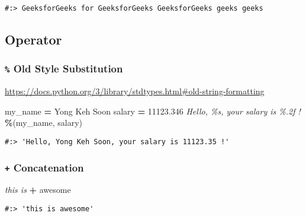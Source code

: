 \documentclass[
]{book}
\newenvironment{Shaded}{\begin{snugshade}}{\end{snugshade}}
\newcommand{\CommentTok}[1]{\textcolor[rgb]{0.37,0.37,0.37}{\textit{#1}}}
\newcommand{\FloatTok}[1]{\textcolor[rgb]{0.06,0.06,0.06}{#1}}
\newcommand{\NormalTok}[1]{#1}
\newcommand{\OperatorTok}[1]{\textcolor[rgb]{0.43,0.43,0.43}{\textbf{#1}}}
\newcommand{\StringTok}[1]{\textcolor[rgb]{0.5,0.5,0.5}{#1}}
\begin{document}
\begin{verbatim}
#:> GeeksforGeeks for GeeksforGeeks GeeksforGeeks geeks geeks
\end{verbatim}

\hypertarget{operator}{%
\subsection{Operator}\label{operator}}

\hypertarget{old-style-substitution}{%
\subsubsection{\texorpdfstring{\texttt{\%} Old Style Substitution}{\% Old Style Substitution}}\label{old-style-substitution}}

\url{https://docs.python.org/3/library/stdtypes.html\#old-string-formatting}

\begin{Shaded}
\begin{Highlighting}[]
\NormalTok{my\_name }\OperatorTok{=} \StringTok{\textquotesingle{}Yong Keh Soon\textquotesingle{}}
\NormalTok{salary  }\OperatorTok{=} \FloatTok{11123.346}
\CommentTok{\textquotesingle{}Hello, \%s, your salary is \%.2f !\textquotesingle{}} \OperatorTok{\%}\NormalTok{(my\_name, salary)}
\end{Highlighting}
\end{Shaded}

\begin{verbatim}
#:> 'Hello, Yong Keh Soon, your salary is 11123.35 !'
\end{verbatim}

\hypertarget{concatenation}{%
\subsubsection{\texorpdfstring{\texttt{+} Concatenation}{+ Concatenation}}\label{concatenation}}

\begin{Shaded}
\begin{Highlighting}[]
\CommentTok{\textquotesingle{}this is \textquotesingle{}} \OperatorTok{+} \StringTok{\textquotesingle{}awesome\textquotesingle{}}
\end{Highlighting}
\end{Shaded}

\begin{verbatim}
#:> 'this is awesome'
\end{verbatim}
\end{document}
